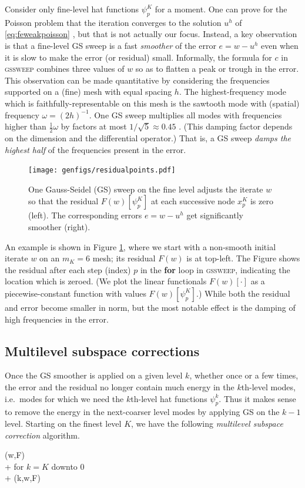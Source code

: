 \documentclass[letterpaper,final,12pt,reqno]{amsart}
\numberwithin{equation}{section}
\numberwithin{figure}{section}
\numberwithin{table}{section}
\begin{document}
Consider only fine-level hat functions $\psi_p^K$ for a moment.  One can prove for the Poisson problem that the iteration converges to the solution $u^h$ of \eqref{eq:feweakpoisson} \cite[for example]{Greenbaum1997}, but that is not actually our focus.  Instead, a key observation is that a fine-level GS sweep is a fast \emph{smoother} of the error $e=w-u^h$ even when it is slow to make the error (or residual) small.  Informally, the formula for $c$ in \textsc{gssweep} combines three values of $w$ so as to flatten a peak or trough in the error.  This observation can be made quantitative by considering the frequencies supported on a (fine) mesh with equal spacing $h$.  The highest-frequency mode which is faithfully-representable on this mesh is the sawtooth mode with (spatial) frequency $\omega=(2h)^{-1}$.  One GS sweep multiplies all modes with frequencies higher than $\frac{1}{2} \omega$ by factors at most $1/\sqrt{5}\approx 0.45$ \cite[Chapter 4]{Briggsetal2000}.  (This damping factor depends on the dimension and the differential operator.)  That is, a GS sweep \emph{damps the highest half} of the frequencies present in the error.

\begin{figure}[t]
\texttt{[image: genfigs/residualpoints.pdf]}
\caption{One Gauss-Seidel (GS) sweep on the fine level adjusts the iterate $w$ so that the residual $F(w)[\psi_p^K]$ at each successive node $x_p^K$ is zero (left).  The corresponding errors $e=w-u^h$ get significantly smoother (right).}
\label{fig:residualpoints}
\end{figure}

An example is shown in Figure \ref{fig:residualpoints}, where we start with a non-smooth initial iterate $w$ on an $m_K=6$ mesh; its residual $F(w)$ is at top-left.  The Figure shows the residual after each step (index) $p$ in the \textbf{for} loop in \textsc{gssweep}, indicating the location which is zeroed.  (We plot the linear functionals $F(w)[\cdot]$ as a piecewise-constant function with values $F(w)[\psi_p^K]$.)  While both the residual and error become smaller in norm, but the most notable effect is the damping of high frequencies in the error.

\subsection*{Multilevel subspace corrections}  Once the GS smoother is applied on a given level $k$, whether once or a few times, the error and the residual no longer contain much energy in the $k$th-level modes, i.e.~modes for which we need the $k$th-level hat functions $\psi_p^k$.  Thus it makes sense to remove the energy in the next-coarser level modes by applying GS on the $k-1$ level.  Starting on the finest level $K$, we have the following \emph{multilevel subspace correction} algorithm.
\begin{pseudo*}
(w,F)\text{:} \\+
    for $k=K$ downto $0$ \\+
        (k,w,F)
\end{pseudo*}
\end{document}
